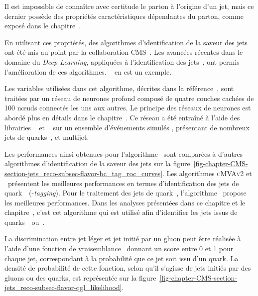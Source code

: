 Il est impossible de connaître avec certitude le parton à l'origine d'un jet,
mais ce dernier possède des propriétés caractéristiques dépendantes du parton, comme exposé dans le chapitre~.
\par
En utilisant ces propriétés, des algorithmes d'identification de la saveur des jets ont été mis au point par la collaboration CMS~\cite{jet_btag_CSV_RunI}.
Les avancées récentes dans le domaine du \emph{Deep Learning}, appliquées à l'identification des jets~\cite{jet_flavor_deep_nn}, ont permis l'amélioration de ces algorithmes.
\DeepCSV~\cite{Sirunyan_heavy_flavor_jets_2018} en est un exemple.
\par Les variables utilisées dans cet algorithme, décrites dans la référence~\cite{Sirunyan_heavy_flavor_jets_2018},
sont traitées par un réseau de neurones profond composé de quatre couches cachées de 100 nœuds connectés les uns aux autres.
Le principe des réseaux de neurones est abordé plus en détails dans le chapitre~.
Ce réseau a été entraîné à l'aide des librairies
\KERAS~\cite{keras}
et
\TENSORFLOW~\cite{tensorflow}
sur un ensemble d'événements simulés \ttbar, présentant de nombreux jets de quarks~\quarkb, et multijet.
\par Les performances ainsi obtenues pour l'algorithme \DeepCSV\ sont comparées à d'autres algorithmes d'identification de la saveur des jets sur la figure~\ref{fig-chapter-CMS-section-jets_reco-subsec-flavor-bc_tag_roc_curves}.
Les algorithmes \textsc{cMVAv2} et \DeepCSV\ présentent les meilleures performances en termes d'identification des jets de quark~\quarkb\ (\quarkb-\emph{tagging}).
Pour le traitement des jets de quark~\quarkc, l'algorithme \DeepCSV\ propose les meilleures performances.
Dans les analyses présentées dans ce chapitre et le chapitre~, c'est cet algorithme qui est utilisé afin d'identifier les jets issus de quarks~\quarkc\ ou~\quarkb.
\par La discrimination entre jet léger et jet initié par un gluon peut être réalisée à l'aide d'une fonction de vraisemblance~\cite{CMS-PAS-JME-13-002} donnant un score entre 0 et 1 pour chaque jet, correspondant à la probabilité que ce jet soit issu d'un quark. La densité de probabilité de cette fonction, selon qu'il s'agisse de jets initiés par des gluons ou des quarks, est représentée sur la figure~\ref{fig-chapter-CMS-section-jets_reco-subsec-flavor-qgl_likelihood}.
